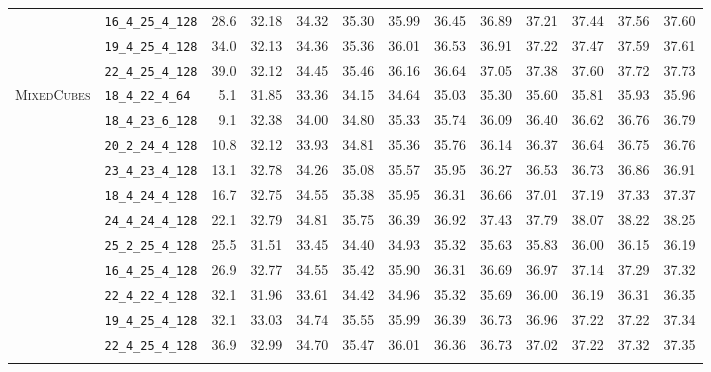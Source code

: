 \documentclass[12pt, a4paper, twoside]{report}
\newcommand{\MixedCubes}{\textsc{MixedCubes}}
\begin{document}
\begin{table}[htbp]
\begin{adjustwidth}{-3cm}{-1cm}
\begin{tabular}{llrrrrrrrrrrr}
   & \texttt{16\_4\_25\_4\_128} & 28.6 & 32.18 & 34.32 & 35.30 & 35.99 & 36.45 & 36.89 & 37.21 & 37.44 & 37.56 & 37.60 \\
   & \texttt{19\_4\_25\_4\_128} & 34.0 & 32.13 & 34.36 & 35.36 & 36.01 & 36.53 & 36.91 & 37.22 & 37.47 & 37.59 & 37.61 \\
   & \texttt{22\_4\_25\_4\_128} & 39.0 & 32.12 & 34.45 & 35.46 & 36.16 & 36.64 & 37.05 & 37.38 & 37.60 & 37.72 & 37.73 \\
\addlinespace
  \MixedCubes{} & \texttt{18\_4\_22\_4\_64} & 5.1 & 31.85 & 33.36 & 34.15 & 34.64 & 35.03 & 35.30 & 35.60 & 35.81 & 35.93 & 35.96 \\
   & \texttt{18\_4\_23\_6\_128} & 9.1 & 32.38 & 34.00 & 34.80 & 35.33 & 35.74 & 36.09 & 36.40 & 36.62 & 36.76 & 36.79 \\
   & \texttt{20\_2\_24\_4\_128} & 10.8 & 32.12 & 33.93 & 34.81 & 35.36 & 35.76 & 36.14 & 36.37 & 36.64 & 36.75 & 36.76 \\
   & \texttt{23\_4\_23\_4\_128} & 13.1 & 32.78 & 34.26 & 35.08 & 35.57 & 35.95 & 36.27 & 36.53 & 36.73 & 36.86 & 36.91 \\
   & \texttt{18\_4\_24\_4\_128} & 16.7 & 32.75 & 34.55 & 35.38 & 35.95 & 36.31 & 36.66 & 37.01 & 37.19 & 37.33 & 37.37 \\
   & \texttt{24\_4\_24\_4\_128} & 22.1 & 32.79 & 34.81 & 35.75 & 36.39 & 36.92 & 37.43 & 37.79 & 38.07 & 38.22 & 38.25 \\
   & \texttt{25\_2\_25\_4\_128} & 25.5 & 31.51 & 33.45 & 34.40 & 34.93 & 35.32 & 35.63 & 35.83 & 36.00 & 36.15 & 36.19 \\
   & \texttt{16\_4\_25\_4\_128} & 26.9 & 32.77 & 34.55 & 35.42 & 35.90 & 36.31 & 36.69 & 36.97 & 37.14 & 37.29 & 37.32 \\
   & \texttt{22\_4\_22\_4\_128} & 32.1 & 31.96 & 33.61 & 34.42 & 34.96 & 35.32 & 35.69 & 36.00 & 36.19 & 36.31 & 36.35 \\
   & \texttt{19\_4\_25\_4\_128} & 32.1 & 33.03 & 34.74 & 35.55 & 35.99 & 36.39 & 36.73 & 36.96 & 37.22 & 37.22 & 37.34 \\
   & \texttt{22\_4\_25\_4\_128} & 36.9 & 32.99 & 34.70 & 35.47 & 36.01 & 36.36 & 36.73 & 37.02 & 37.22 & 37.32 & 37.35 \\
\addlinespace
\bottomrule
\end{tabular}
\end{adjustwidth}
\end{table}

\end{document}
